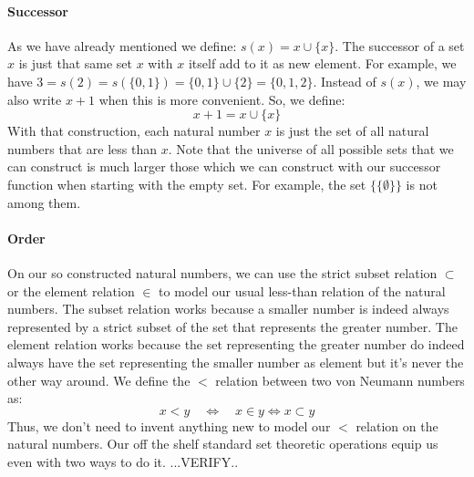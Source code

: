 \paragraph{Successor}
As we have already mentioned we define: $s(x) = x \cup \{x\}$. The successor of a set $x$ is just that same set $x$ with $x$ itself add to it as new element. For example, we have $3 = s(2) = s(\{0,1\}) = \{0,1\} \cup \{2\} = \{0,1,2\}$. Instead of $s(x)$, we may also write $x+1$ when this is more convenient. So, we define:
\begin{equation}
x + 1 = x \cup \{x\}
\end{equation}
With that construction, each natural number $x$ is just the set of all natural numbers that are less than $x$. Note that the universe of all possible sets that we can construct is much larger those which we can construct with our successor function when starting with the empty set. For example, the set $\{\{\emptyset\}\}$ is not among them.

\paragraph{Order}
On our so constructed natural numbers, we can use the strict subset relation $\subset$ or the element relation $\in$ to model our usual less-than relation of the natural numbers. The subset relation works because a smaller number is indeed always represented by a strict subset of the set that represents the greater number. The element relation works because the set representing the greater number do indeed always have the set representing the smaller number as element but it's never the other way around. We define the $<$ relation between two von Neumann numbers as:
\begin{equation}
x < y  \quad \Leftrightarrow \quad x \in y \Leftrightarrow x \subset y
\end{equation}
Thus, we don't need to invent anything new to model our $<$ relation on the natural numbers. Our off the shelf standard set theoretic operations equip us even with two ways to do it. ...VERIFY..


